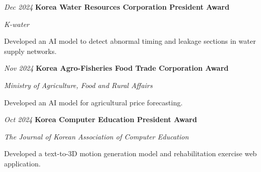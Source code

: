 \begin{samepage}
    \begin{twocolentry}{\textit{Dec 2024}}
        \textbf{Korea Water Resources Corporation President Award}
        \par\textit{K-water}
    \end{twocolentry}
    \begin{onecolentry}
        \begin{highlights}
            \item Developed an AI model to detect abnormal timing and leakage sections in water supply networks.
        \end{highlights}
    \end{onecolentry}
\end{samepage}

\vspace{0.08cm}

\begin{samepage}
    \begin{twocolentry}{\textit{Nov 2024}}
        \textbf{Korea Agro-Fisheries Food Trade Corporation Award}
        \par\textit{Ministry of Agriculture, Food and Rural Affairs}
    \end{twocolentry}
    \begin{onecolentry}
        \begin{highlights}
            \item Developed an AI model for agricultural price forecasting.
        \end{highlights}
    \end{onecolentry}
\end{samepage}

\vspace{0.08cm}

\begin{samepage}
    \begin{twocolentry}{\textit{Oct 2024}}
        \textbf{Korea Computer Education President Award}
        \par\textit{The Journal of Korean Association of Computer Education}
    \end{twocolentry}
    \begin{onecolentry}
        \begin{highlights}
            \item Developed a text-to-3D motion generation model and rehabilitation exercise web application.
        \end{highlights}
    \end{onecolentry}
\end{samepage}

